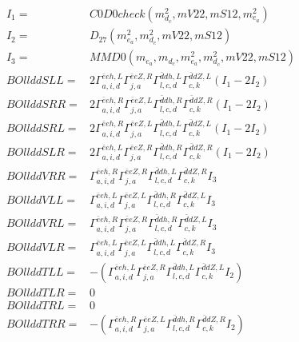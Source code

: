 \documentclass[A4,landscape]{article}
\begin{document}
\begin{align} 
I_1 = & C0D0check(m^2_{d_{{c}}}, mV22, mS12, m^2_{e_{{a}}}) \\ 
I_2 = & D_{27}(m^2_{e_{{a}}}, m^2_{d_{{c}}}, mV22, mS12) \\ 
I_3 = & MMD0(m_{e_{{a}}}, m_{d_{{c}}}, m^2_{e_{{a}}}, m^2_{d_{{c}}}, mV22, mS12) \\ 
  BOllddSLL= & 2  \Gamma^{\bar{e}e h ,L}_{a, i, d} \Gamma^{\bar{e}e Z ,R}_{j, a} \Gamma^{\bar{d}d h ,L}_{l, c, d} \Gamma^{\bar{d}d Z ,L}_{c, k} (I_1 - 2 I_2) \\ 
  BOllddSRR= & 2  \Gamma^{\bar{e}e h ,R}_{a, i, d} \Gamma^{\bar{e}e Z ,L}_{j, a} \Gamma^{\bar{d}d h ,R}_{l, c, d} \Gamma^{\bar{d}d Z ,R}_{c, k} (I_1 - 2 I_2) \\ 
  BOllddSRL= & 2  \Gamma^{\bar{e}e h ,R}_{a, i, d} \Gamma^{\bar{e}e Z ,L}_{j, a} \Gamma^{\bar{d}d h ,L}_{l, c, d} \Gamma^{\bar{d}d Z ,L}_{c, k} (I_1 - 2 I_2) \\ 
  BOllddSLR= & 2  \Gamma^{\bar{e}e h ,L}_{a, i, d} \Gamma^{\bar{e}e Z ,R}_{j, a} \Gamma^{\bar{d}d h ,R}_{l, c, d} \Gamma^{\bar{d}d Z ,R}_{c, k} (I_1 - 2 I_2) \\ 
  BOllddVRR= &  \Gamma^{\bar{e}e h ,R}_{a, i, d} \Gamma^{\bar{e}e Z ,R}_{j, a} \Gamma^{\bar{d}d h ,L}_{l, c, d} \Gamma^{\bar{d}d Z ,R}_{c, k} I_3 \\ 
  BOllddVLL= &  \Gamma^{\bar{e}e h ,L}_{a, i, d} \Gamma^{\bar{e}e Z ,L}_{j, a} \Gamma^{\bar{d}d h ,R}_{l, c, d} \Gamma^{\bar{d}d Z ,L}_{c, k} I_3 \\ 
  BOllddVRL= &  \Gamma^{\bar{e}e h ,R}_{a, i, d} \Gamma^{\bar{e}e Z ,R}_{j, a} \Gamma^{\bar{d}d h ,R}_{l, c, d} \Gamma^{\bar{d}d Z ,L}_{c, k} I_3 \\ 
  BOllddVLR= &  \Gamma^{\bar{e}e h ,L}_{a, i, d} \Gamma^{\bar{e}e Z ,L}_{j, a} \Gamma^{\bar{d}d h ,L}_{l, c, d} \Gamma^{\bar{d}d Z ,R}_{c, k} I_3 \\ 
  BOllddTLL= & -( \Gamma^{\bar{e}e h ,L}_{a, i, d} \Gamma^{\bar{e}e Z ,R}_{j, a} \Gamma^{\bar{d}d h ,L}_{l, c, d} \Gamma^{\bar{d}d Z ,L}_{c, k} I_2) \\ 
  BOllddTLR= & 0 \\ 
  BOllddTRL= & 0 \\ 
  BOllddTRR= & -( \Gamma^{\bar{e}e h ,R}_{a, i, d} \Gamma^{\bar{e}e Z ,L}_{j, a} \Gamma^{\bar{d}d h ,R}_{l, c, d} \Gamma^{\bar{d}d Z ,R}_{c, k} I_2) \\ 
\end{align} 
\end{document}
